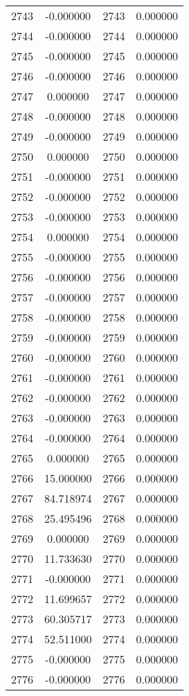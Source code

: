 \documentclass[12pt]{article}
\begin{document}
\begin{longtable}{@{}cccc@{}}
2743 & -0.000000 & 2743 & 0.000000 \\
2744 & -0.000000 & 2744 & 0.000000 \\
2745 & -0.000000 & 2745 & 0.000000 \\
2746 & -0.000000 & 2746 & 0.000000 \\
2747 & 0.000000 & 2747 & 0.000000 \\
2748 & -0.000000 & 2748 & 0.000000 \\
2749 & -0.000000 & 2749 & 0.000000 \\
2750 & 0.000000 & 2750 & 0.000000 \\
2751 & -0.000000 & 2751 & 0.000000 \\
2752 & -0.000000 & 2752 & 0.000000 \\
2753 & -0.000000 & 2753 & 0.000000 \\
2754 & 0.000000 & 2754 & 0.000000 \\
2755 & -0.000000 & 2755 & 0.000000 \\
2756 & -0.000000 & 2756 & 0.000000 \\
2757 & -0.000000 & 2757 & 0.000000 \\
2758 & -0.000000 & 2758 & 0.000000 \\
2759 & -0.000000 & 2759 & 0.000000 \\
2760 & -0.000000 & 2760 & 0.000000 \\
2761 & -0.000000 & 2761 & 0.000000 \\
2762 & -0.000000 & 2762 & 0.000000 \\
2763 & -0.000000 & 2763 & 0.000000 \\
2764 & -0.000000 & 2764 & 0.000000 \\
2765 & 0.000000 & 2765 & 0.000000 \\
2766 & 15.000000 & 2766 & 0.000000 \\
2767 & 84.718974 & 2767 & 0.000000 \\
2768 & 25.495496 & 2768 & 0.000000 \\
2769 & 0.000000 & 2769 & 0.000000 \\
2770 & 11.733630 & 2770 & 0.000000 \\
2771 & -0.000000 & 2771 & 0.000000 \\
2772 & 11.699657 & 2772 & 0.000000 \\
2773 & 60.305717 & 2773 & 0.000000 \\
2774 & 52.511000 & 2774 & 0.000000 \\
2775 & -0.000000 & 2775 & 0.000000 \\
2776 & -0.000000 & 2776 & 0.000000 \\

\end{longtable}
\end{document}
